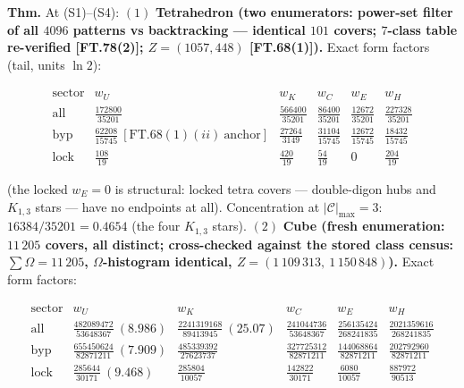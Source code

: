 \begin{theorem}\label{tag:FT-99}
\textbf{Thm.} At (S1)–(S4): $(1)$ \textbf{Tetrahedron (two enumerators: power-set filter of all $4096$ patterns vs backtracking — identical $101$ covers; $7$-class table re-verified [FT.78(2)]; $Z=(1057,448)$ [FT.68(1)]).} Exact form factors (tail, units $\ln2$):

\[
\begin{array}{c|ccccc}
\text{sector} & w_U & w_K & w_C & w_E & w_H\\
\hline
\text{all} & \tfrac{172800}{35201} & \tfrac{566400}{35201} & \tfrac{86400}{35201} & \tfrac{12672}{35201} & \tfrac{227328}{35201}\\
\text{byp} & \tfrac{62208}{15745}\ [\mathrm{FT.68}(1)(ii)\ \text{anchor}] & \tfrac{27264}{3149} & \tfrac{31104}{15745} & \tfrac{12672}{15745} & \tfrac{18432}{15745}\\
\text{lock} & \tfrac{108}{19} & \tfrac{420}{19} & \tfrac{54}{19} & 0 & \tfrac{204}{19}
\end{array}
\]

(the locked $w_E=0$ is structural: locked tetra covers — double-digon hubs and $K_{1,3}$ stars — have no endpoints at all). Concentration at $|\mathcal C|_{\max}=3$: $16384/35201=0.4654$ (the four $K_{1,3}$ stars). $(2)$ \textbf{Cube (fresh enumeration: $11\,205$ covers, all distinct; cross-checked against the stored class census: $\sum\Omega=11\,205$, $\Omega$-histogram identical, $Z=(1\,109\,313,\ 1\,150\,848)$).} Exact form factors:

\[
\begin{array}{c|ccccc}
\text{sector} & w_U & w_K & w_C & w_E & w_H\\
\hline
\text{all} & \tfrac{482089472}{53648367}\ (8.986) & \tfrac{2241319168}{89413945}\ (25.07) & \tfrac{241044736}{53648367} & \tfrac{256135424}{268241835} & \tfrac{2021359616}{268241835}\\
\text{byp} & \tfrac{655450624}{82871211}\ (7.909) & \tfrac{485339392}{27623737} & \tfrac{327725312}{82871211} & \tfrac{144068864}{82871211} & \tfrac{202792960}{82871211}\\
\text{lock} & \tfrac{285644}{30171}\ (9.468) & \tfrac{285804}{10057} & \tfrac{142822}{30171} & \tfrac{6080}{10057} & \tfrac{887972}{90513}
\end{array}
\]


\end{theorem}
